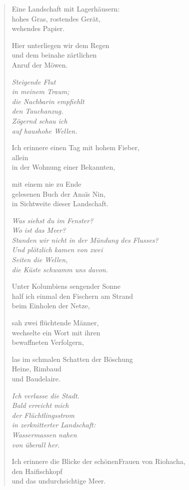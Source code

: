 
\cleartoverso


\begin{verse}

Eine Landschaft mit Lagerhäusern:\\
hohes Gras, rostendes Gerät,\\
wehendes Papier.

Hier unterliegen wir dem Regen\\
und dem beinahe zärtlichen\\
Anruf der Möwen.

{\itshape
Steigende Flut\\
in meinem Traum;\\
die Nachbarin empfiehlt\\
den Tauchanzug.\\
Zögernd schau ich\\
auf haushohe Wellen.}

Ich erinnere einen Tag mit hohem Fieber,\\
allein\\
in der Wohnung einer Bekannten,

mit einem nie zu Ende\\
gelesenen Buch der Anaïs Nin,\\
in Sichtweite dieser Landschaft.

{\itshape
Was siehst du im Fenster?\\
Wo ist das Meer?\\
Standen wir nicht in der Mündung des Flusses?\\
Und plötzlich kamen von zwei\\
Seiten die Wellen,\\
die Küste schwamm uns davon.}

Unter Kolumbiens sengender Sonne\\
half ich einmal den Fischern am Strand\\
beim Einholen der Netze,

sah zwei flüchtende Männer,\\
wechselte ein Wort mit ihren\\
bewaffneten Verfolgern,

las im schmalen Schatten der Böschung\\
Heine, Rimbaud\\
und Baudelaire.

{\itshape
Ich verlasse die Stadt.\\
Bald erreicht mich\\
der Flüchtlingsstrom\\
in zerknitterter Landschaft:\\
Wassermassen nahen\\
von überall her.}

Ich erinnere die Blicke der schönen\verselinebreak Frauen von Riohacha,\\
den Haifischkopf\\
und das undurchsichtige Meer.

\end{verse}

